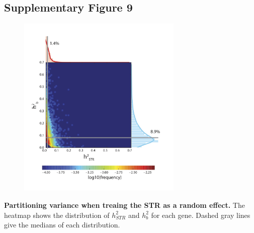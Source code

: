 \pagebreak
\subsection{Supplementary Figure 9}
\begin{figure}[h!]
\centering
\label{fig:estrsupfig9}
\includegraphics[width=0.7\textwidth]{Figures/Chapter4/SuppFig9.jpg}
\end{figure}
\textbf{Partitioning variance when treaing the STR as a random effect.} The heatmap shows the distribution of $h^2_{STR}$ and $h^2_{b}$ for each gene. Dashed gray lines give the medians of each distribution.

\pagebreak
